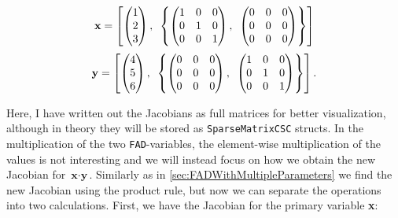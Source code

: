 \begin{multicols}{2}
    \noindent
    \begin{align*}
        \textbf{x} = \left[\begin{pmatrix}1\\2\\3
        \end{pmatrix},\hspace{0.5em}\left\{
        \begin{pmatrix}
        1&0&0\\
        0&1&0\\
        0&0&1\end{pmatrix},\hspace{0.5em}\begin{pmatrix}
        0&0&0\\
        0&0&0\\
        0&0&0
        \end{pmatrix}\right\} \right]
    \end{align*}
    \begin{align*}
        \textbf{y} = \left[\begin{pmatrix}4\\5\\6
        \end{pmatrix},\hspace{0.5em}\left\{
        \begin{pmatrix}
        0&0&0\\
        0&0&0\\
        0&0&0\end{pmatrix},\hspace{0.5em}\begin{pmatrix}
        1&0&0\\
        0&1&0\\
        0&0&1
        \end{pmatrix}\right\} \right].
    \end{align*}
\end{multicols}
Here, I have written out the Jacobians as full matrices for better visualization, although in theory they will be stored as \texttt{SparseMatrixCSC} structs. In the multiplication of the two \texttt{FAD}-variables, the element-wise multiplication of the values is not interesting and we will instead focus on how we obtain the new Jacobian for $\textbf{x}\cdot \textbf{y}$. Similarly as in \autoref{sec:FADWithMultipleParameters} we find the new Jacobian using the product rule, but now we can separate the operations into two calculations. First, we have the Jacobian for the primary variable \textbf{x}:
